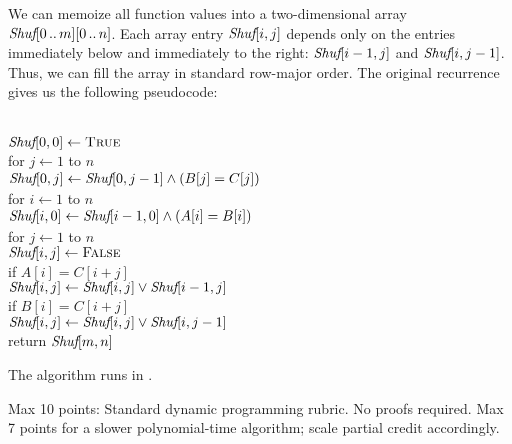 \documentclass[11pt]{article}
\begin{document}
\begin{enumerate}
\begin{solution}
We can memoize all function values into a two-dimensional array $\emph{Shuf}[0\,..\,m][0\,..\,n]$.  Each array entry $\emph{Shuf}[i,j]$ depends only on the entries immediately below and immediately to the right: $\emph{Shuf}[i-1,j]$ and $\emph{Shuf}[i,j-1]$.  Thus, we can fill the array in standard row-major order.  The original recurrence gives us the following pseudocode:
\begin{algo}
	\+
\\	$\emph{Shuf}[0,0] \gets \textsc{True}$
\\	for $j\gets 1$ to $n$\+
\\		$\emph{Shuf}[0,j] \gets \emph{Shuf}[0,j-1] \strut\land (B[j]=C[j])$\-
\\[0.5ex]
	for $i\gets 1$ to $n$\+
\\		$\emph{Shuf}[i,0] \gets \emph{Shuf}[i-1,0] \strut\land (A[i]=B[i])$
\\[0.5ex]
		for $j\gets 1$ to $n$\+
\\			$\emph{Shuf}[i,j] \gets \textsc{False}$
\\			if $A[i]=C[i+j]$\+
\\				$\emph{Shuf}[i,j] \gets
					\emph{Shuf}[i,j] \lor \emph{Shuf}[i-1,j]$\-
\\			if $B[i]=C[i+j]$\+
\\				$\emph{Shuf}[i,j] \gets
					\emph{Shuf}[i,j] \lor \emph{Shuf}[i,j-1]$\-\-\-
\\[1ex]
	return $\emph{Shuf}[m,n]$
\end{algo}
The algorithm runs in .
\end{solution}

\begin{rubric}
Max 10 points: Standard dynamic programming rubric.  No proofs required.  Max 7 points for a slower polynomial-time algorithm; scale partial credit accordingly.
\end{rubric}

\end{enumerate}
\end{document}
